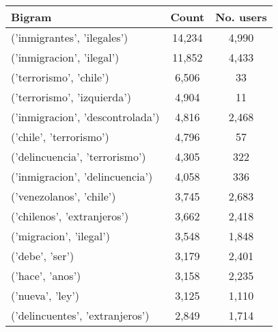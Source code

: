 %
    
    \begin{tabular}{lcc}
        \toprule\toprule
        Bigram & Count & No. users\\ \midrule
        ('inmigrantes', 'ilegales') & 14,234 & 4,990 \\ 
        ('inmigracion', 'ilegal') &  11,852 &4,433 \\ 
        ('terrorismo', 'chile') &  6,506 & 33 \\ 
        ('terrorismo', 'izquierda') &  4,904 & 11 \\
        ('inmigracion', 'descontrolada') & 4,816 & 2,468 \\ 
        ('chile', 'terrorismo') & 4,796 & 57 \\ 
        ('delincuencia', 'terrorismo') & 4,305 & 322 \\ 
        ('inmigracion', 'delincuencia') & 4,058 & 336 \\
        ('venezolanos', 'chile') & 3,745 & 2,683 \\ 
        ('chilenos', 'extranjeros') & 3,662 & 2,418 \\
        ('migracion', 'ilegal') & 3,548 & 1,848 \\ 
        ('debe', 'ser') & 3,179 & 2,401 \\ 
        ('hace', 'anos') & 3,158 & 2,235 \\
        ('nueva', 'ley') & 3,125 & 1,110 \\
        ('delincuentes', 'extranjeros') & 2,849 & 1,714 \\
        \bottomrule\bottomrule
    \end{tabular}

%
